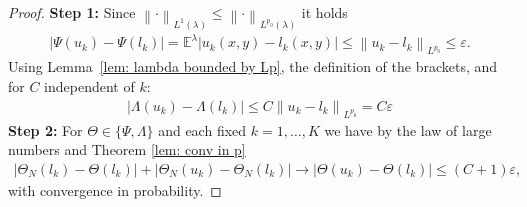 \documentclass{amsart}
\theoremstyle{definition}
\newcommand{\E}{{\mathbb E}}
\newcommand{\norm}[1]{\left\|#1\right\|}
\begin{document}
\begin{proof}
    \noindent\textbf{Step 1:}
    Since $\norm{\cdot}_{L^1(\lambda)} \le \norm{\cdot}_{L^{p_0}(\lambda)}$ it holds
    \begin{eqnarray}\label{eq: Psis}
        |\Psi(u_k) - \Psi(l_k)| = \E^\lambda |u_k(x, y) - l_k(x, y)|  \le \norm{u_k - l_k}_{L^{p_0}}  \le \varepsilon.
    \end{eqnarray}
    Using Lemma~\ref{lem: lambda bounded by Lp}, the definition of the brackets, and for $C$ independent of $k$:
    \begin{eqnarray}\label{eq: Lambdas}
        |\Lambda(u_k) - \Lambda(l_k)| \le C \norm{u_k - l_k}_{L^{p_0}}   = C \varepsilon
    \end{eqnarray}
\textbf{Step 2:}
For $\Theta \in \{ \Psi, \Lambda\}$ and each fixed $k = 1, \dots, K$ we have by the law of large numbers and Theorem \ref{lem: conv in p}
\begin{align*}
     |\Theta_N(l_k) - \Theta(l_k)| + |\Theta_N(u_k) - \Theta_N(l_k)|  \to |\Theta(u_k) - \Theta(l_k)| \le (C+1) \varepsilon,
\end{align*}
with convergence in probability. 


\end{proof}
\end{document}
